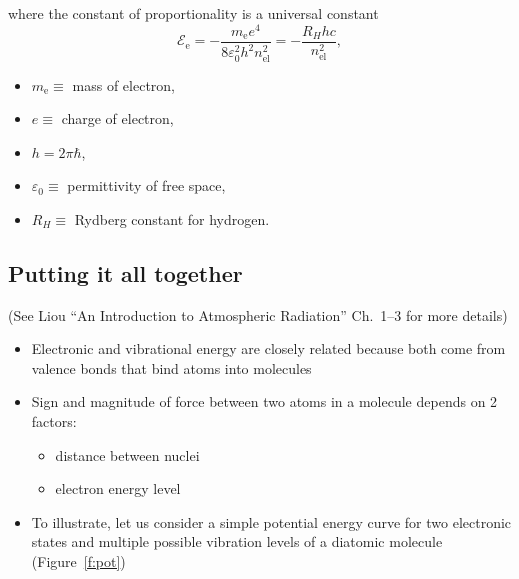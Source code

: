 \documentclass[11pt, oneside]{article}
\begin{document}
\begin{itemize}
\begin{itemize}
		where the constant of proportionality is a universal constant
		\begin{equation}
			\label{e:Ee}
			\mathcal{E}_\mathrm{e} = -\frac{m_\mathrm{e}e^4}{8\varepsilon_0^2h^2n_\mathrm{el}^2} = -\frac{R_Hhc}{n_\mathrm{el}^2},
		\end{equation}
		\begin{itemize}
			\item[] $m_\mathrm{e} \equiv$ mass of electron,
			\item[] $e \equiv$ charge of electron,
			\item[] $h = 2\pi\hbar$,
			\item[] $\varepsilon_0 \equiv$ permittivity of free space,
			\item[] $R_H \equiv$ Rydberg constant for hydrogen.
		\end{itemize}
	\end{itemize}
\end{itemize}

\subsection{Putting it all together}
\label{s:together}

(See Liou ``An Introduction to Atmospheric Radiation'' Ch.~1--3 for more details)

\begin{itemize}
	\item[--] Electronic and vibrational energy are closely related because both come from valence bonds that bind atoms into molecules
	\item[--] Sign and magnitude of force between two atoms in a molecule depends on 2 factors:
	\begin{itemize}
		\item distance between nuclei
		\item electron energy level
	\end{itemize}
	\item[--] To illustrate, let us consider a simple potential energy curve for two electronic states and multiple possible vibration levels of a diatomic molecule (Figure~\ref{f:pot})
\end{itemize}
\end{document}
